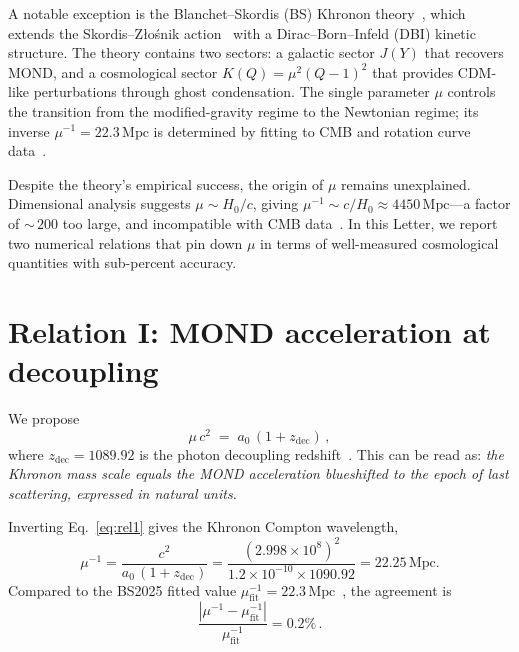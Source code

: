 \documentclass[prl,twocolumn,superscriptaddress,longbibliography]{revtex4-2}
\newcommand{\Mpc}{\,\mathrm{Mpc}}
\newcommand{\zdec}{z_{\mathrm{dec}}}
\begin{document}
A notable exception is the Blanchet--Skordis (BS) Khronon
theory~\cite{BS2024,BS2025}, which extends the
Skordis--Z\l o\'snik action~\cite{SZ2021} with a
Dirac--Born--Infeld (DBI) kinetic structure.
The theory contains two sectors: a galactic sector
$J(Y)$ that recovers MOND, and a cosmological sector
$K(Q) = \mu^2(Q - 1)^2$ that provides CDM-like
perturbations through ghost condensation.
The single parameter $\mu$ controls the transition
from the modified-gravity regime to the Newtonian regime;
its inverse $\mu^{-1} = 22.3\Mpc$ is determined by
fitting to CMB and rotation curve data~\cite{BS2025}.

Despite the theory's empirical success, the origin of $\mu$
remains unexplained.
Dimensional analysis suggests $\mu \sim H_0/c$, giving
$\mu^{-1} \sim c/H_0 \approx 4450\Mpc$---a factor of
${\sim}\,200$ too large, and incompatible with CMB
data~\cite{BS2025}.
In this Letter, we report two numerical relations
that pin down $\mu$ in terms of well-measured
cosmological quantities with sub-percent accuracy.


\section{Relation I: MOND acceleration at decoupling}
\label{sec:rel1}

We propose
\begin{equation}
  \mu\, c^2 \;=\; a_0\,(1 + \zdec) \,,
  \label{eq:rel1}
\end{equation}
where $\zdec = 1089.92$ is the photon decoupling
redshift~\cite{Planck2018}.
This can be read as: \emph{the Khronon mass scale equals
the MOND acceleration blueshifted to the epoch of
last scattering, expressed in natural units.}

Inverting Eq.~\eqref{eq:rel1} gives the Khronon
Compton wavelength,
\begin{equation}
  \mu^{-1}
  = \frac{c^2}{a_0\,(1 + \zdec)}
  = \frac{(2.998 \times 10^8)^2}
         {1.2 \times 10^{-10} \times 1090.92}
  = 22.25\Mpc .
  \label{eq:rel1_value}
\end{equation}
Compared to the BS2025 fitted value
$\mu^{-1}_{\mathrm{fit}} = 22.3\Mpc$~\cite{BS2025},
the agreement is
\begin{equation}
  \frac{|\mu^{-1} - \mu^{-1}_{\mathrm{fit}}|}
       {\mu^{-1}_{\mathrm{fit}}}
  = 0.2\% \,.
\end{equation}
\end{document}
